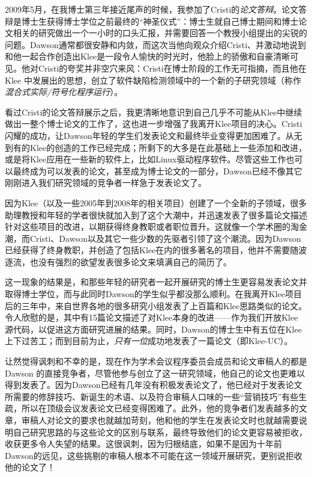 \documentclass[12pt,UTF8,nofonts]{book}
\begin{document}
\breakline

2009年5月，在我博士第三年接近尾声的时候，我参加了Cristi的\emph{论文答辩}。论文答辩是博士生获得博士学位之前最终的“神圣仪式”：博士生就自己博士期间和博士论文相关的研究做出一个一小时的口头汇报，并需要回答一个教授小组提出的尖锐的问题。Dawson通常都很安静和内敛，而这次当他向观众介绍Cristi、并激动地说到和他一起合作创造出Klee是一段令人愉快的时光时，他脸上的骄傲和自豪清晰可见。他对Cristi的夸奖并非空穴来风：Cristi在博士阶段的工作无可指摘，而且他在Klee 中发展出的思想，创立了软件缺陷检测领域中的一个新的子研究领域（称作\emph{混合式实际/符号化程序运行}）。

看过Cristi的论文答辩展示之后，我更清晰地意识到自己几乎不可能从Klee中继续做出一整个博士论文的工作了，这也进一步增强了我离开Klee项目的决心。Cristi 闪耀的成功，让Dawson年轻的学生们发表论文和最终毕业变得更加困难了。从无到有的Klee的创造的工作已经完成；所剩下的大多是在此基础上一些添加和改进，或是将Klee应用在一些新的软件上，比如Linux驱动程序软件。尽管这些工作也可以最终成为可以发表的论文，甚至成为博士论文的一部分，Dawson已经不像其它刚刚进入我们研究领域的竞争者一样急于发表论文了。

因为Klee（以及一些2005年到2008年的相关项目）创建了一个全新的子领域，很多助理教授和年轻的学者很快就加入到了这个大潮中，并迅速发表了很多篇论文描述针对这些项目的改进，以期获得终身教职或者职位晋升。这就像一个学术圈的淘金潮，而Cristi、Dawson以及其它一些少数的先驱者引领了这个潮流。因为Dawson已经获得了终身教职，并创造了包括Klee在内的很多著名的项目，他并不需要随波逐流，也没有强烈的欲望发表很多论文来填满自己的简历了。

这一现象的结果是，和那些年轻的研究者一起开展研究的博士生更容易发表论文并取得博士学位，而与此同时Dawson的学生似乎都没那么顺利。在我离开Klee项目后的三年中，来自世界各地的很多研究小组发表了上百篇和Klee思路类似的论文。令人欣慰的是，其中有15篇论文描述了对Klee本身的改进——作为我们开放Klee 源代码，以促进这方面研究进展的结果。同时，Dawson的博士生中有五位在Klee上下过苦工；而到目前为止，\emph{只有一位}成功地发表了一篇论文（即Klee-UC）。

让然觉得讽刺和不幸的是，现在作为学术会议程序委员会成员和论文审稿人的都是Dawson 的直接竞争者，尽管他参与创立了这一研究领域，他自己的论文也更难以得到发表了。因为Dawson已经有几年没有积极发表论文了，他已经对于发表论文所需要的修辞技巧、新诞生的术语、以及符合审稿人口味的一些“营销技巧”有些生疏，所以在顶级会议发表论文已经变得困难了。此外，他的竞争者们发表越多的文章，审稿人对论文的要求也就越加苛刻，他和他的学生在发表论文时也就越需要说明自己研究思路的与这些论文的区别与联系，最终导致他们的论文更容易被拒收，收获更多令人失望的结果。这很讽刺，因为归根结底，如果不是因为十年前Dawson的远见，这些挑剔的审稿人根本不可能在这一领域开展研究，更别说拒收他的论文了！
\end{document}
